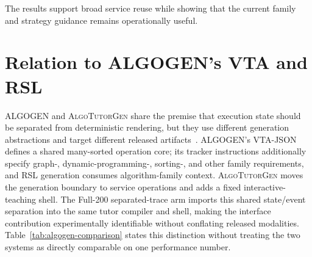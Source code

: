 \documentclass[letterpaper]{article}
\newcommand{\system}{\textsc{AlgoTutorGen}}
\begin{document}
The results support broad service reuse while
showing that the current family and strategy guidance remains
operationally useful.

\section{Relation to ALGOGEN's VTA and RSL}

ALGOGEN and \system{} share the premise that execution state should be separated from deterministic rendering, but they use different generation abstractions and target different released artifacts~\cite{liaokunpeng-etal-2026-algogen}. ALGOGEN's VTA-JSON defines a shared many-sorted operation core; its tracker instructions additionally specify graph-, dynamic-programming-, sorting-, and other family requirements, and RSL generation consumes algorithm-family context. \system{} moves the generation boundary to service operations and adds a fixed interactive-teaching shell. The Full-200 separated-trace arm imports this shared state/event separation into the same tutor compiler and shell, making the interface contribution experimentally identifiable without conflating released modalities. Table~\ref{tab:algogen-comparison} states this distinction without treating the two systems as directly comparable on one performance number.
\end{document}
